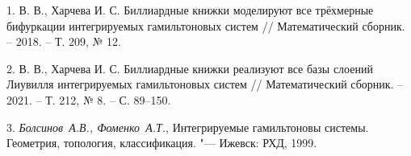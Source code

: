 \litlist

1. { В. В., Харчева И. С.} Биллиардные книжки моделируют все трёхмерные бифуркации интегрируемых гамильтоновых систем // Математический сборник. -- 2018. -- Т. 209, № 12.

2. { В. В., Харчева И. С.} Биллиардные книжки реализуют все базы слоений Лиувилля интегрируемых гамильтоновых систем // Математический сборник. -- 2021. -- Т. 212, № 8. -- С. 89–150.

3. {\it Болсинов~А.В., Фоменко~А.Т.}, Интегрируемые гамильтоновы системы. Геометрия, топология, классификация. "--- Ижевск: РХД, 1999.
